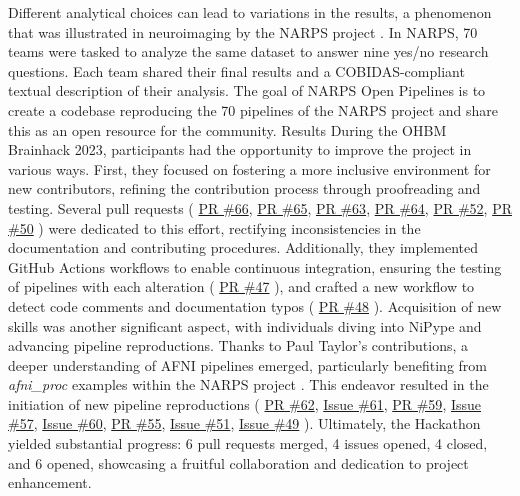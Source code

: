 \documentclass{article}
\begin{document}
Different analytical choices can lead to variations in the results, a phenomenon that was illustrated in neuroimaging by the NARPS project \cite{botvinik2020}. In NARPS, 70 teams were tasked to analyze the same dataset to answer nine yes/no research questions. Each team shared their final results and a COBIDAS-compliant \cite{nichols2017} textual description of their analysis. The goal of NARPS Open Pipelines is to create a codebase reproducing the 70 pipelines of the NARPS project and share this as an open resource for the community.
Results
During the OHBM Brainhack 2023, participants had the opportunity to improve the project in various ways. First, they focused on fostering a more inclusive environment for new contributors, refining the contribution process through proofreading and testing. Several pull requests (
\href{https://github.com/Inria-Empenn/narps_open_pipelines/pull/66}{PR \#66},
\href{https://github.com/Inria-Empenn/narps_open_pipelines/pull/65}{PR \#65},
\href{https://github.com/Inria-Empenn/narps_open_pipelines/pull/63}{PR \#63},
\href{https://github.com/Inria-Empenn/narps_open_pipelines/pull/64}{PR \#64},
\href{https://github.com/Inria-Empenn/narps_open_pipelines/pull/52}{PR \#52},
\href{https://github.com/Inria-Empenn/narps_open_pipelines/pull/50}{PR \#50}
) were dedicated to this effort, rectifying inconsistencies in the documentation and contributing procedures.
Additionally, they implemented GitHub Actions workflows to enable continuous integration, ensuring the testing of pipelines with each alteration (
\href{https://github.com/Inria-Empenn/narps_open_pipelines/pull/47}{PR \#47}
), and crafted a new workflow to detect code comments and documentation typos (
\href{https://github.com/Inria-Empenn/narps_open_pipelines/pull/48}{PR \#48}
).
Acquisition of new skills was another significant aspect, with individuals diving into NiPype and advancing pipeline reproductions. Thanks to Paul Taylor's contributions, a deeper understanding of AFNI pipelines emerged, particularly benefiting from \textit{afni\_proc} examples within the NARPS project \cite{taylor2023}. This endeavor resulted in the initiation of new pipeline reproductions (
\href{https://github.com/Inria-Empenn/narps_open_pipelines/pull/62}{PR \#62},
\href{https://github.com/Inria-Empenn/narps_open_pipelines/issues/61}{Issue \#61},
\href{https://github.com/Inria-Empenn/narps_open_pipelines/pull/59}{PR \#59},
\href{https://github.com/Inria-Empenn/narps_open_pipelines/issues/57}{Issue \#57},
\href{https://github.com/Inria-Empenn/narps_open_pipelines/issues/60}{Issue \#60},
\href{https://github.com/Inria-Empenn/narps_open_pipelines/pull/55}{PR \#55},
\href{https://github.com/Inria-Empenn/narps_open_pipelines/issues/51}{Issue \#51},
\href{https://github.com/Inria-Empenn/narps_open_pipelines/issues/49}{Issue \#49}
).
Ultimately, the Hackathon yielded substantial progress: 6 pull requests merged, 4 issues opened, 4 closed, and 6 opened, showcasing a fruitful collaboration and dedication to project enhancement.
\end{document}
